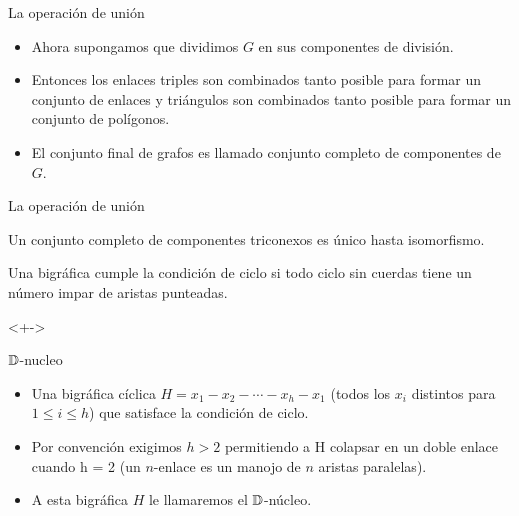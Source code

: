 \documentclass[spanish]{beamer}
\begin{document}
\begin{frame}{La operación de unión}
	\begin{itemize}
	\item Ahora supongamos que dividimos $G$ en sus componentes de división. 
	\item Entonces los enlaces triples son combinados tanto posible para formar un conjunto de enlaces y triángulos son combinados tanto posible para formar un conjunto de polígonos.
	\item El conjunto final de grafos es llamado conjunto completo de componentes de $G$.
	\end{itemize}
\end{frame}

\begin{frame}{La operación de unión}
  \begin{lemma}
   Un conjunto completo de componentes triconexos es único hasta isomorfismo.
  \end{lemma}
\end{frame}

\begin{frame}
	\begin{definitions}
	Una bigráfica cumple la condición de ciclo si todo ciclo sin cuerdas tiene un número impar de aristas punteadas.
	\end{definitions}
	\begin{example}<+->
  \centering
  \end{example}
\end{frame}

\begin{frame}{$\mathbb{D}$-nucleo}
  \begin{itemize}
  \item Una bigráfica cíclica $ H = x_{1} - x_{2} - \cdots - x_{h}-x_{1}$ (todos los $x_{i}$ distintos para $ 1 \leq i \leq h$) que satisface la condición de ciclo.
  \item  Por convención exigimos $h > 2$ permitiendo a H colapsar en un doble enlace cuando h = 2 (un $n$-enlace es un manojo de $n$ aristas paralelas). 
  \item A esta bigráfica $H$ le llamaremos el $\mathbb{D}$-núcleo.
  \end{itemize}
\end{frame}
\end{document}
